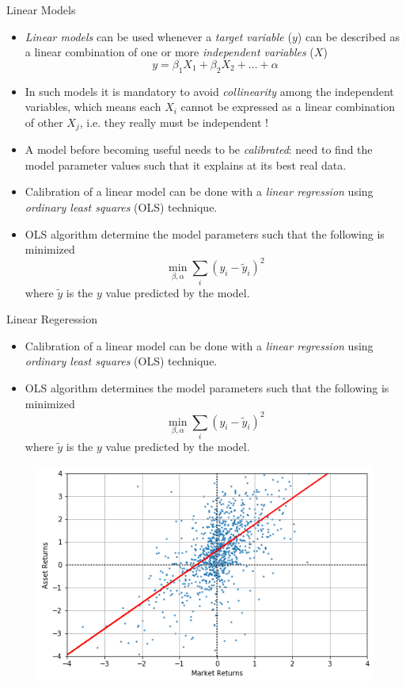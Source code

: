 \documentclass{beamer}
\begin{document}
\begin{frame}{Linear Models}
  \begin{itemize}
    \item \emph{Linear models} can be used whenever a \emph{target variable} ($y$) can be described as a linear combination of one or more \emph{independent variables} ($X$)
      \begin{equation*}
        y = \beta_1 X_1 + \beta_2 X_2 + \ldots + \alpha
      \end{equation*}
    \item In such models it is mandatory to avoid \emph{collinearity} among the independent variables, which means each $X_i$ cannot be expressed as a linear combination of other $X_j$, i.e. they really must be independent !
    \item A model before becoming useful needs to be \emph{calibrated}: need to find the model parameter values such that it explains at its best real data.
    \item Calibration of a linear model can be done with a \emph{linear regression} using \emph{ordinary least squares} (OLS) technique.
    \item OLS algorithm determine the model parameters such that the following is minimized
      \begin{equation*}
        \min_{\beta,\alpha}\sum_i (y_i - \tilde{y}_i)^2
      \end{equation*}
      where $\tilde{y}$ is the $y$ value predicted by the model.
  \end{itemize}
\end{frame}

\begin{frame}{Linear Regeression}
  \begin{itemize}
  \item Calibration of a linear model can be done with a \emph{linear regression} using \emph{ordinary least squares} (OLS) technique.
  \item OLS algorithm determines the model parameters such that the following is minimized
    \begin{equation*}
      \min_{\beta,\alpha}\sum_i (y_i - \tilde{y}_i)^2
    \end{equation*}
    where $\tilde{y}$ is the $y$ value predicted by the model.
  \end{itemize}
  \begin{figure}[h]
    \begin{center}
      \includegraphics[width=0.45\linewidth]{linear_regression}
    \end{center}
  \end{figure}
\end{frame}
\end{document}
